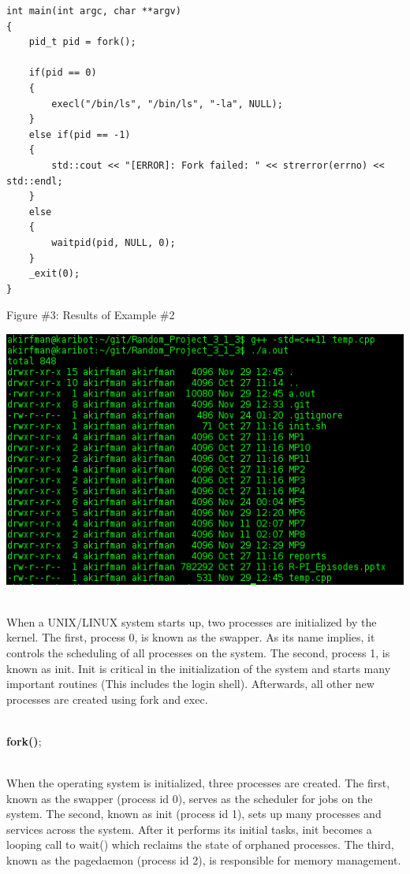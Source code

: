 \documentclass[12pt]{extarticle}
\newenvironment{myindentpar}[1]%
 {\begin{list}{}%
         {\setlength{\leftmargin}{#1}}%
         \item[]%
 }
 {\end{list}}
\begin{document}
\begin{myindentpar}{5mm}
\begin{lstlisting}[frame=single]
int main(int argc, char **argv)
{
    pid_t pid = fork();
    
    if(pid == 0)
    {
        execl("/bin/ls", "/bin/ls", "-la", NULL);
    }
    else if(pid == -1)
    {
        std::cout << "[ERROR]: Fork failed: " << strerror(errno) << std::endl;
    }
    else
    {
        waitpid(pid, NULL, 0);
    }
    _exit(0);
}
\end{lstlisting}

\newpage

    \begin{center}
        Figure \#3: Results of Example \#2
    \end{center}
    \begin{center}
        \includegraphics[scale=0.8]{e2_output.png}
    \end{center}

    \ \\
    When a UNIX/LINUX system starts up, two processes are initialized by the kernel.  The first, process 0, is known as the swapper.  As its name implies, it controls the scheduling of all processes on the system.  The second, process 1, is known as init.  Init is critical in the initialization of the system and starts many important routines (This includes the login shell).  Afterwards, all other new processes are created using fork and exec.  

    \ \\
    \textbf{fork()};
    
    \ \\
    When the operating system is initialized, three processes are created.  The first, known as the swapper (process id 0), serves as the scheduler for jobs on the system.  The second, known as init (process id 1), sets up many processes and services across the system.  After it performs its initial tasks, init becomes a looping call to wait() which reclaims the state of orphaned processes.  The third, known as the pagedaemon (process id 2), is responsible for memory management.  
    

\end{myindentpar}
\end{document}
